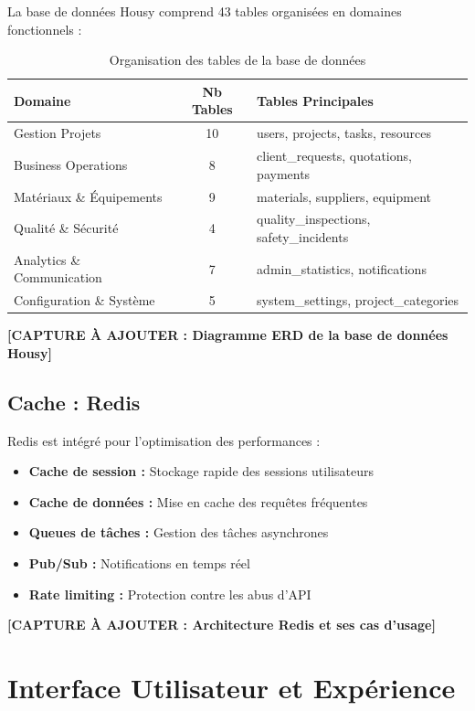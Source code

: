 La base de données Housy comprend 43 tables organisées en domaines fonctionnels :

\begin{table}[h]
\centering
\begin{tabular}{|l|c|l|}
\hline
\textbf{Domaine} & \textbf{Nb Tables} & \textbf{Tables Principales} \\
\hline
Gestion Projets & 10 & users, projects, tasks, resources \\
\hline
Business Operations & 8 & client\_requests, quotations, payments \\
\hline
Matériaux \& Équipements & 9 & materials, suppliers, equipment \\
\hline
Qualité \& Sécurité & 4 & quality\_inspections, safety\_incidents \\
\hline
Analytics \& Communication & 7 & admin\_statistics, notifications \\
\hline
Configuration \& Système & 5 & system\_settings, project\_categories \\
\hline
\end{tabular}
\caption{Organisation des tables de la base de données}
\end{table}

\textbf{[CAPTURE À AJOUTER : Diagramme ERD de la base de données Housy]}

\subsection{Cache : Redis}

Redis est intégré pour l'optimisation des performances :

\begin{itemize}
    \item \textbf{Cache de session :} Stockage rapide des sessions utilisateurs
    \item \textbf{Cache de données :} Mise en cache des requêtes fréquentes
    \item \textbf{Queues de tâches :} Gestion des tâches asynchrones
    \item \textbf{Pub/Sub :} Notifications en temps réel
    \item \textbf{Rate limiting :} Protection contre les abus d'API
\end{itemize}

\textbf{[CAPTURE À AJOUTER : Architecture Redis et ses cas d'usage]}

\section{Interface Utilisateur et Expérience}

